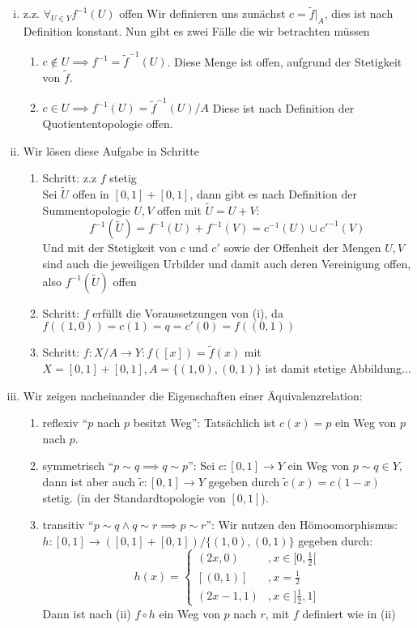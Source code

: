 \documentclass{scrartcl}
\begin{document}
\setcounter{section}{5}
\setcounter{aufgabe}{1}
\begin{aufgabe}
\begin{enumerate}[(i)]
\item \begin{seg}{z.z. $ \forall_{U\in Y} f^{-1}(U) $ offen}
Wir definieren uns zunächst $ c=\tilde f|_A $, dies ist nach Definition konstant.  Nun gibt es zwei Fälle die wir betrachten müssen
\begin{enumerate}
\item $c\notin U \implies f^{-1}=\tilde f^{-1}(U)$. Diese Menge ist offen, aufgrund der Stetigkeit von $ \tilde f $.
\item $ c\in U \implies f^{-1}(U)=\tilde f^{-1}(U)/A $ Diese ist nach Definition der Quotiententopologie offen.
\end{enumerate}
\end{seg}
\item Wir lösen diese Aufgabe in Schritte
\begin{enumerate}[1.]
\item Schritt: z.z $ f $ stetig\\
Sei $ \tilde U $ offen in $ [0,1]+[0,1] $, dann gibt es nach Definition der Summentopologie $ U,V $ offen mit $ \tilde U=U+V $:
\[
f^{-1}(\tilde U)=f^{-1}(U)+f^{-1}(V)=c^{-1}(U)\cup {c'}^{-1}(V)
\]
Und mit der Stetigkeit von $ c $ und $ c' $ sowie der Offenheit der Mengen $ U,V $ sind auch die jeweiligen Urbilder und damit auch deren Vereinigung offen, also $ f^{-1}(\tilde U) $ offen
\item Schritt: $ f $ erfüllt die Voraussetzungen von (i), da $f((1,0))=c(1)=q=c'(0)=f((0,1))$
\item Schritt: $ f: X/A\to Y: f([x])=\tilde f(x) $ mit $ X=[0,1]+[0,1], A=\{(1,0),(0,1)\}  $ ist damit stetige Abbildung...
\end{enumerate}
\item Wir zeigen nacheinander die Eigenschaften einer Äquivalenzrelation:
\begin{enumerate}
\item reflexiv "`$ p $ nach $ p $ besitzt Weg"':  Tatsächlich ist $ c(x)=p $ ein Weg von $ p $ nach $ p $.
\item symmetrisch "`$p\sim q\implies q\sim p$"': Sei $c:[0,1]\to Y $ ein Weg von $ p\sim q\in Y $, dann ist aber auch $ \tilde c:[0,1]\to Y $ gegeben durch $ \tilde c(x)=c(1-x) $ stetig. (in der Standardtopologie von $[0,1]$).
\item transitiv "`$ p\sim q\land q\sim r\implies p\sim r $"': Wir nutzen den Hömoomorphismus: $ h: [0,1]\to ([0,1]+[0,1])/\{(1,0),(0,1)\} $ gegeben durch: 
\[
h(x)=\begin{cases} (2x, 0)&, x\in[0,\frac{1}{2}[ \\ [(0,1)]&, x=\frac 1 2\\ (2x-1, 1)&, x\in]\frac{1}{2}, 1] \end{cases}  
\]    
Dann ist nach (ii) $ f\circ h $ ein Weg von $ p $ nach $ r $, mit $ f $ definiert wie in (ii)
\end{enumerate}
\end{enumerate}
\end{aufgabe}
\end{document}
